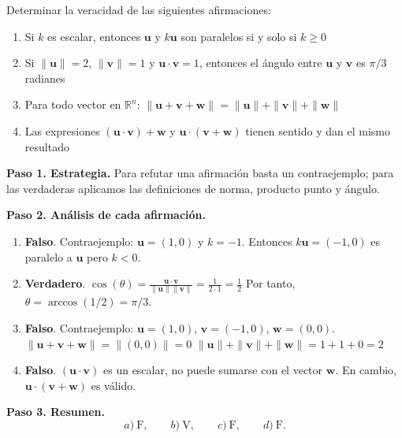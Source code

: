 \begin{prob}
Determinar la veracidad de las siguientes afirmaciones:

\begin{enumerate}[$(a)$]
\item Si $k$ es escalar, entonces $\mathbf{u}$ y $k\mathbf{u}$ son paralelos si y solo si $k \geq 0$
\item Si $\|\mathbf{u}\| = 2$, $\|\mathbf{v}\| = 1$ y $\mathbf{u} \cdot \mathbf{v} = 1$, entonces el ángulo entre $\mathbf{u}$ y $\mathbf{v}$ es $\pi/3$ radianes
\item Para todo vector en $\mathbb{R}^n$: $\|\mathbf{u} + \mathbf{v} + \mathbf{w}\| = \|\mathbf{u}\| + \|\mathbf{v}\| + \|\mathbf{w}\|$
\item Las expresiones $(\mathbf{u} \cdot \mathbf{v}) + \mathbf{w}$ y $\mathbf{u} \cdot (\mathbf{v} + \mathbf{w})$ tienen sentido y dan el mismo resultado
\end{enumerate}

\begin{myproof}
\textbf{Paso 1. Estrategia.} Para refutar una afirmación basta un contraejemplo; para las verdaderas aplicamos las definiciones de norma, producto punto y ángulo.

\textbf{Paso 2. Análisis de cada afirmación.}
\begin{enumerate}[$(a)$]
\item \textbf{Falso}. Contraejemplo: $\mathbf{u} = (1,0)$ y $k = -1$. Entonces $k\mathbf{u} = (-1,0)$ es paralelo a $\mathbf{u}$ pero $k < 0$.

\item \textbf{Verdadero}. $\cos(\theta) = \frac{\mathbf{u} \cdot \mathbf{v}}{\|\mathbf{u}\|\|\mathbf{v}\|} = \frac{1}{2 \cdot 1} = \frac{1}{2}$
Por tanto, $\theta = \arccos(1/2) = \pi/3$.

\item \textbf{Falso}. Contraejemplo: $\mathbf{u} = (1,0)$, $\mathbf{v} = (-1,0)$, $\mathbf{w} = (0,0)$.
$\|\mathbf{u} + \mathbf{v} + \mathbf{w}\| = \|(0,0)\| = 0$
$\|\mathbf{u}\| + \|\mathbf{v}\| + \|\mathbf{w}\| = 1 + 1 + 0 = 2$

\item \textbf{Falso}. $(\mathbf{u} \cdot \mathbf{v})$ es un escalar, no puede sumarse con el vector $\mathbf{w}$. En cambio, $\mathbf{u} \cdot (\mathbf{v} + \mathbf{w})$ es válido.
\end{enumerate}

\textbf{Paso 3. Resumen.}
\[
\boxed{a)\ \text{F},\qquad b)\ \text{V},\qquad c)\ \text{F},\qquad d)\ \text{F}.}
\]
\end{myproof}
\end{prob}

